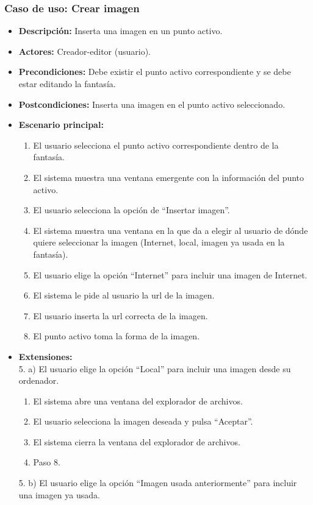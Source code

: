 \subsubsection{Caso de uso: Crear imagen}
\begin{itemize}
	\item \textbf{Descripción:} Inserta una imagen en un punto activo.
	\item \textbf{Actores:} Creador-editor (usuario).
	\item \textbf{Precondiciones:} Debe existir el punto activo correspondiente y se debe estar editando la fantasía.
	\item \textbf{Postcondiciones:} Inserta una imagen en el punto activo seleccionado.
	\item \textbf{Escenario principal:}
	\begin{enumerate}
		\item El usuario selecciona el punto activo correspondiente dentro de la fantasía.
		\item El sistema muestra una ventana emergente con la información del punto activo.
		\item El usuario selecciona la opción de ``Insertar imagen''.
		\item El sistema muestra una ventana en la que da a elegir al usuario de dónde quiere seleccionar la imagen (Internet, local, imagen ya usada en la fantasía).
		\item El usuario elige la opción ``Internet'' para incluir una imagen de Internet.
		\item El sistema le pide al usuario la url de la imagen.
		\item El usuario inserta la url correcta de la imagen.
		\item El punto activo toma la forma de la imagen.
	\end{enumerate}
	\item \textbf{Extensiones:} \\5. a) El usuario elige la opción ``Local'' para incluir una imagen desde su ordenador.
	\begin{enumerate}
		\item El sistema abre una ventana del explorador de archivos.
		\item El usuario selecciona la imagen deseada y pulsa ``Aceptar''.
		\item El sistema cierra la ventana del explorador de archivos.
		\item Paso 8.
	\end{enumerate}
	5. b) El usuario elige la opción ``Imagen usada anteriormente'' para incluir una imagen ya usada.

\end{itemize}
